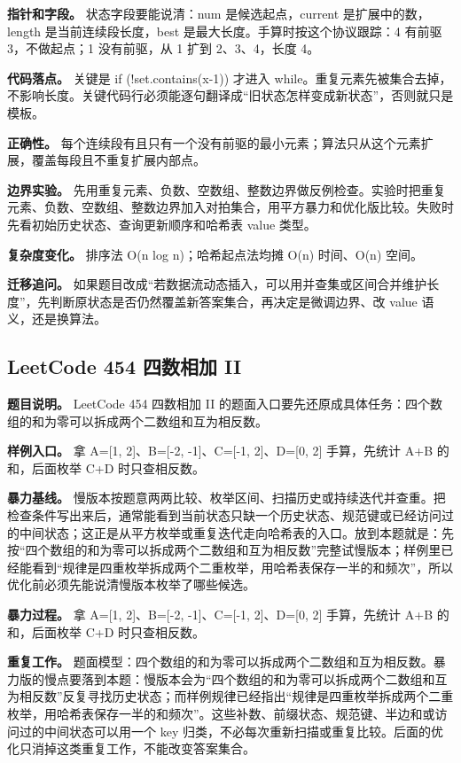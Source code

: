 \textbf{指针和字段。} 状态字段要能说清：num 是候选起点，current 是扩展中的数，length 是当前连续段长度，best 是最大长度。手算时按这个协议跟踪：4 有前驱 3，不做起点；1 没有前驱，从 1 扩到 2、3、4，长度 4。

\textbf{代码落点。} 关键是 if (!set.contains(x-1)) 才进入 while。重复元素先被集合去掉，不影响长度。关键代码行必须能逐句翻译成“旧状态怎样变成新状态”，否则就只是模板。

\textbf{正确性。} 每个连续段有且只有一个没有前驱的最小元素；算法只从这个元素扩展，覆盖每段且不重复扩展内部点。

\textbf{边界实验。} 先用重复元素、负数、空数组、整数边界做反例检查。实验时把重复元素、负数、空数组、整数边界加入对拍集合，用平方暴力和优化版比较。失败时先看初始历史状态、查询更新顺序和哈希表 value 类型。

\textbf{复杂度变化。} 排序法 O(n log n)；哈希起点法均摊 O(n) 时间、O(n) 空间。

\textbf{迁移追问。} 如果题目改成“若数据流动态插入，可以用并查集或区间合并维护长度”，先判断原状态是否仍然覆盖新答案集合，再决定是微调边界、改 value 语义，还是换算法。

\subsection{LeetCode 454 四数相加 II}

\textbf{题目说明。} LeetCode 454 四数相加 II 的题面入口要先还原成具体任务：四个数组的和为零可以拆成两个二数组和互为相反数。

\textbf{样例入口。} 拿 A=[1, 2]、B=[-2, -1]、C=[-1, 2]、D=[0, 2] 手算，先统计 A+B 的和，后面枚举 C+D 时只查相反数。

\textbf{暴力基线。} 慢版本按题意两两比较、枚举区间、扫描历史或持续迭代并查重。把检查条件写出来后，通常能看到当前状态只缺一个历史状态、规范键或已经访问过的中间状态；这正是从平方枚举或重复迭代走向哈希表的入口。放到本题就是：先按“四个数组的和为零可以拆成两个二数组和互为相反数”完整试慢版本；样例里已经能看到“规律是四重枚举拆成两个二重枚举，用哈希表保存一半的和频次”，所以优化前必须先能说清慢版本枚举了哪些候选。

\textbf{暴力过程。} 拿 A=[1, 2]、B=[-2, -1]、C=[-1, 2]、D=[0, 2] 手算，先统计 A+B 的和，后面枚举 C+D 时只查相反数。

\textbf{重复工作。} 题面模型：四个数组的和为零可以拆成两个二数组和互为相反数。暴力版的慢点要落到本题：慢版本会为“四个数组的和为零可以拆成两个二数组和互为相反数”反复寻找历史状态；而样例规律已经指出“规律是四重枚举拆成两个二重枚举，用哈希表保存一半的和频次”。这些补数、前缀状态、规范键、半边和或访问过的中间状态可以用一个 key 归类，不必每次重新扫描或重复比较。后面的优化只消掉这类重复工作，不能改变答案集合。

